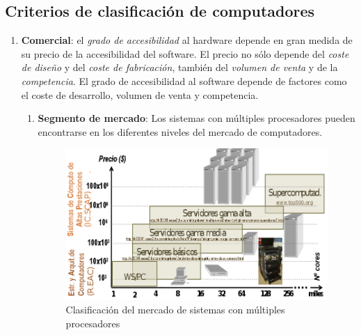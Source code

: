 \documentclass[10pt,a4paper,spanish]{report}
\begin{document}
\textcolor[rgb]{0.2,0.4,0.8}{\subsection{Criterios de clasificación de computadores}}
\begin{enumerate}[\color{azul}{\bf $\heartsuit$}]
\item \textbf{\textcolor[rgb]{0.2,0.4,0.8}{Comercial}}: el \textit{\textcolor[rgb]{0.2,0.4,0.8}{grado de accesibilidad}} al hardware depende en gran medida de su precio de la accesibilidad del software. El precio no sólo depende del \textit{\textcolor[rgb]{0.2,0.4,0.8}{coste de diseño}} y del \textit{\textcolor[rgb]{0.2,0.4,0.8}{coste de fabricación}}, también del \textit{\textcolor[rgb]{0.2,0.4,0.8}{volumen de venta}} y de la \textit{\textcolor[rgb]{0.2,0.4,0.8}{competencia}}. El grado de accesibilidad al software depende de factores como el coste de desarrollo, volumen de venta y competencia.
\begin{enumerate}[$\longrightarrow$]
\item \textbf{\textcolor[rgb]{0.2,0.4,0.8}{Segmento de mercado}}: Los sistemas con múltiples procesadores pueden encontrarse en los diferentes niveles del mercado de computadores.

\begin{figure}[!h]
\centering
\includegraphics[width=1\textwidth]{10}
\caption{Clasificación del mercado de sistemas con múltiples procesadores}
\label{grafica_mercado}
\end{figure}


\end{enumerate}
\end{enumerate}
\end{document}
